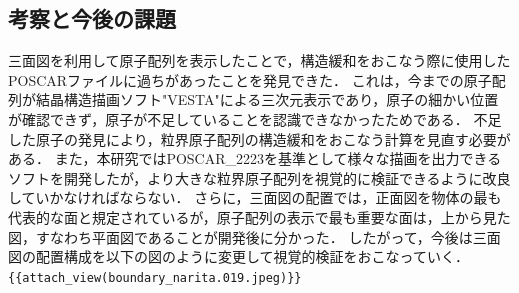 \subsection{考察と今後の課題}
三面図を利用して原子配列を表示したことで，構造緩和をおこなう際に使用したPOSCARファイルに過ちがあったことを発見できた．
これは，今までの原子配列が結晶構造描画ソフト"VESTA"による三次元表示であり，原子の細かい位置が確認できず，原子が不足していることを認識できなかったためである．
不足した原子の発見により，粒界原子配列の構造緩和をおこなう計算を見直す必要がある．
また，本研究ではPOSCAR\_2223を基準として様々な描画を出力できるソフトを開発したが，より大きな粒界原子配列を視覚的に検証できるように改良していかなければならない．
さらに，三面図の配置では，正面図を物体の最も代表的な面と規定されているが，原子配列の表示で最も重要な面は，上から見た図，すなわち平面図であることが開発後に分かった．
したがって，今後は三面図の配置構成を以下の図のように変更して視覚的検証をおこなっていく．
\verb|{{attach_view(boundary_narita.019.jpeg)}}|

